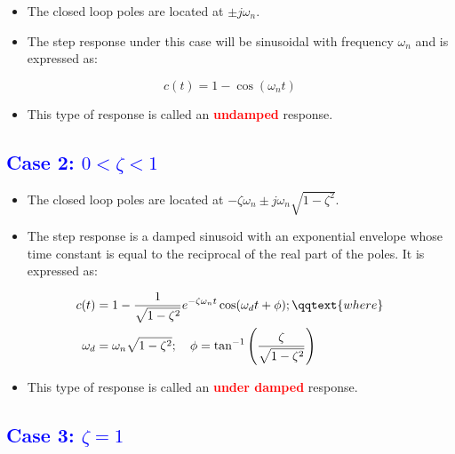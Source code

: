 \documentclass[
  14pt,
  a4paper,
  oneside,
  open=any,
  a4paper,
  14pt]{report}
\providecommand{\tightlist}{%
  \setlength{\itemsep}{0pt}\setlength{\parskip}{0pt}}\usepackage{longtable,booktabs,array}
\begin{document}
\begin{itemize}
\item
  The closed loop poles are located at \(\pm j\omega_n\).
\item
  The step response under this case will be sinusoidal with frequency
  \(\omega_n\) and is expressed as:
\end{itemize}

\[
    c(t)=1-\cos(\omega_n t)
\]

\begin{itemize}
\tightlist
\item
  This type of response is called an \textcolor{red}{\textbf{undamped}}
  response.
\end{itemize}

\subsection{\texorpdfstring{\textcolor{blue}{Case 2:
\(0 < \zeta < 1\)}}{Case 2: 0 \textless{} \textbackslash zeta \textless{} 1}}\label{case-2-0-zeta-1}

\begin{itemize}
\item
  The closed loop poles are located at
  \(-\zeta \omega_n \pm j\omega_n\sqrt{1-\zeta^2}\).
\item
  The step response is a damped sinusoid with an exponential envelope
  whose time constant is equal to the reciprocal of the real part of the
  poles. It is expressed as:
\end{itemize}

\[
\begin{aligned}
    c(t) &= 1 - \dfrac{1}{\sqrt{1-\zeta^2}}e^{-\zeta\omega_n t} \cos(\omega_d t + \phi); \qqtext{where} \\
    \omega_d &= \omega_n \sqrt{1-\zeta^2}; \quad \phi = \tan^{-1}\left(\dfrac{\zeta}{\sqrt{1-\zeta^2}}\right)
\end{aligned}
\]

\begin{itemize}
\tightlist
\item
  This type of response is called an \textcolor{red}{\textbf{under
  damped}} response.
\end{itemize}

\subsection{\texorpdfstring{\textcolor{blue}{Case 3:
\(\zeta = 1\)}}{Case 3: \textbackslash zeta = 1}}\label{case-3-zeta-1}
\end{document}
